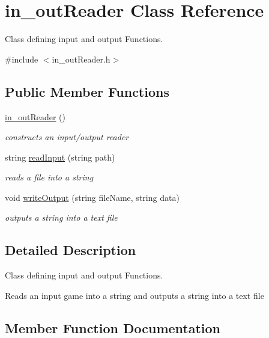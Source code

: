 \hypertarget{classin__out_reader}{}\section{in\+\_\+out\+Reader Class Reference}
\label{classin__out_reader}


Class defining input and output Functions.  




{\ttfamily \#include $<$in\+\_\+out\+Reader.\+h$>$}

\subsection*{Public Member Functions}
\begin{DoxyCompactItemize}
\item 
\mbox{\label{classin__out_reader_a503ce8dc77dc54e68a4105149d961abf}} 
\hyperlink{classin__out_reader_a503ce8dc77dc54e68a4105149d961abf}{in\+\_\+out\+Reader} ()
\begin{DoxyCompactList}\small\item\em constructs an input/output reader \end{DoxyCompactList}\item 
string \hyperlink{classin__out_reader_a472e8c4522ae2ad44f2059c4984a44aa}{read\+Input} (string path)
\begin{DoxyCompactList}\small\item\em reads a file into a string \end{DoxyCompactList}\item 
void \hyperlink{classin__out_reader_aaae376a66225af54a288cee7b5a6331e}{write\+Output} (string file\+Name, string data)
\begin{DoxyCompactList}\small\item\em outputs a string into a text file \end{DoxyCompactList}\end{DoxyCompactItemize}


\subsection{Detailed Description}
Class defining input and output Functions. 

Reads an input game into a string and outputs a string into a text file 

\subsection{Member Function Documentation}
\mbox{\label{classin__out_reader_a472e8c4522ae2ad44f2059c4984a44aa}} 
